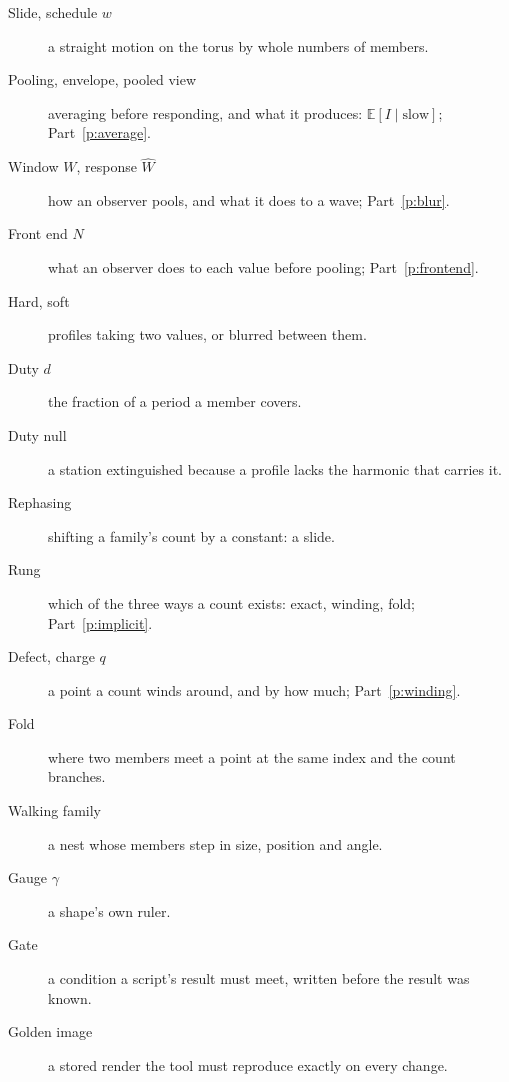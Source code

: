 \documentclass[10pt]{article}
\theoremstyle{plain}
\theoremstyle{definition}
\newcommand{\E}{\mathbb{E}}
\begin{document}
\begin{description}
\item[Slide, schedule $w$] a straight motion on the torus by whole numbers
of members.
\item[Pooling, envelope, pooled view] averaging before responding, and what
it produces: $\E[I\mid\text{slow}]$; Part~\ref{p:average}.
\item[Window $W$, response $\widehat W$] how an observer pools, and what it
does to a wave; Part~\ref{p:blur}.
\item[Front end $N$] what an observer does to each value before pooling;
Part~\ref{p:frontend}.
\item[Hard, soft] profiles taking two values, or blurred between them.
\item[Duty $d$] the fraction of a period a member covers.
\item[Duty null] a station extinguished because a profile lacks the harmonic
that carries it.
\item[Rephasing] shifting a family's count by a constant: a slide.
\item[Rung] which of the three ways a count exists: exact, winding, fold;
Part~\ref{p:implicit}.
\item[Defect, charge $q$] a point a count winds around, and by how much;
Part~\ref{p:winding}.
\item[Fold] where two members meet a point at the same index and the count
branches.
\item[Walking family] a nest whose members step in size, position and
angle.
\item[Gauge $\gamma$] a shape's own ruler.
\item[Gate] a condition a script's result must meet, written before the
result was known.
\item[Golden image] a stored render the tool must reproduce exactly on
every change.
\end{description}
\end{document}
